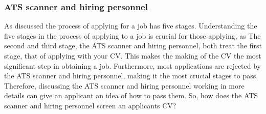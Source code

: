 \subsubsection{ATS scanner and hiring personnel}
As discussed the process of applying for a job has five stages.
Understanding the five stages in the process of applying to a job is crucial for those applying, as 
The second and third stage, the ATS scanner and hiring personnel, both treat the first stage, that of applying with your CV.
This makes the making of the CV the most significant step in obtaining a job.
Furthermore, most applications are rejected by the ATS scanner and hiring personnel, making it the most crucial stages to pass.
Therefore, discussing the ATS scanner and hiring personnel working in more details can give an applicant an idea of how to pass them.
So, how does the ATS scanner and hiring personnel screen an applicants CV? \\

